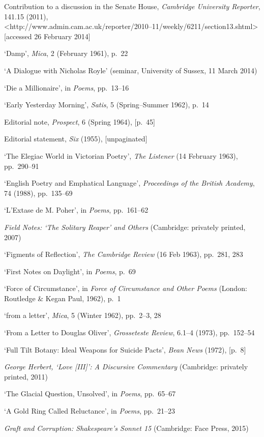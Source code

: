 \documentclass[]{article}
\begin{document}
Contribution to a discussion in the Senate House, \emph{Cambridge
University Reporter}, 141.15 (2011),\\
\textless{}http://www.admin.cam.ac.uk/reporter/2010–11/weekly/6211/section13.shtml\textgreater{}
{[}accessed 26 February 2014{]}

‘Damp’, \emph{Mica}, 2 (February 1961), p.~22

‘A Dialogue with Nicholas Royle’ (seminar, University of Sussex, 11
March 2014)

‘Die a Millionaire’, in \emph{Poems}, pp.~13–16

‘Early Yesterday Morning’, \emph{Satis}, 5 (Spring–Summer 1962), p.~14

Editorial note, \emph{Prospect}, 6 (Spring 1964), {[}p.~45{]}

Editorial statement, \emph{Six} (1955), {[}unpaginated{]}

‘The Elegiac World in Victorian Poetry’, \emph{The Listener} (14
February 1963), pp.~290–91

‘English Poetry and Emphatical Language’, \emph{Proceedings of the
British Academy}, 74 (1988), pp.~135–69

‘L’Extase de M. Poher’, in \emph{Poems}, pp.~161–62

\emph{Field Notes: ‘The Solitary Reaper’ and Others} (Cambridge:
privately printed, 2007)

‘Figments of Reflection’, \emph{The Cambridge Review} (16 Feb 1963),
pp.~281, 283

‘First Notes on Daylight’, in \emph{Poems}, p.~69

‘Force of Circumstance’, in \emph{Force of Circumstance and Other Poems}
(London: Routledge \& Kegan Paul, 1962), p.~1

‘from a letter’, \emph{Mica}, 5 (Winter 1962), pp.~2–3, 28

‘From a Letter to Douglas Oliver’, \emph{Grosseteste Review}, 6.1–4
(1973), pp.~152–54

‘Full Tilt Botany: Ideal Weapons for Suicide Pacts’, \emph{Bean News}
(1972), {[}p.~8{]}

\emph{George Herbert, ‘Love {[}III{]}’: A Discursive Commentary}
(Cambridge: privately printed, 2011)

‘The Glacial Question, Unsolved’, in \emph{Poems}, pp.~65–67

‘A Gold Ring Called Reluctance’, in \emph{Poems}, pp.~21–23

\emph{Graft and Corruption: Shakespeare’s Sonnet 15} (Cambridge: Face
Press, 2015)
\end{document}
